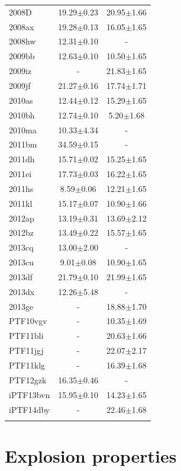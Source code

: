 \documentclass[a4paper,fleqn,usenatbib]{mnras}
\begin{document}
\begin{table}
\begin{minipage}{90mm}
\begin{tabular}{lcc}
2008D & 19.29$\pm$0.23 & 20.95$\pm$1.66 \\
2008ax & 19.28$\pm$0.13 & 16.05$\pm$1.65 \\
2008hw & 12.31$\pm$0.10 & - \\
2009bb & 12.63$\pm$0.10 & 10.50$\pm$1.65 \\
2009iz & - &21.83$\pm$1.65 \\
2009jf & 21.27$\pm$0.16 & 17.74$\pm$1.71 \\
2010as & 12.44$\pm$0.12 & 15.29$\pm$1.65 \\
2010bh & 12.74$\pm$0.10 & 5.20$\pm$1.68 \\
2010ma & 10.33$\pm$4.34 & - \\
2011bm & 34.59$\pm$0.15 & - \\
2011dh & 15.71$\pm$0.02 & 15.25$\pm$1.65 \\
2011ei & 17.73$\pm$0.03 & 16.22$\pm$1.65 \\
2011hs & 8.59$\pm$0.06 & 12.21$\pm$1.65 \\
2011kl & 15.17$\pm$0.07 & 10.90$\pm$1.66 \\
2012ap & 13.19$\pm$0.31 & 13.69$\pm$2.12 \\
2012bz & 13.49$\pm$0.22 & 15.57$\pm$1.65 \\
2013cq & 13.00$\pm$2.00 & - \\
2013cu & 9.01$\pm$0.08 & 10.90$\pm$1.65 \\
2013df & 21.79$\pm$0.10 & 21.99$\pm$1.65 \\
2013dx & 12.26$\pm$5.48 & - \\
2013ge & - &18.88$\pm$1.70 \\
PTF10vgv & - &10.35$\pm$1.69 \\
PTF11bli & - &20.63$\pm$1.66 \\
PTF11jgj & - &22.07$\pm$2.17 \\
PTF11klg & - &16.39$\pm$1.68 \\
PTF12gzk & 16.35$\pm$0.46 & - \\
iPTF13bvn & 15.95$\pm$0.10 & 14.23$\pm$1.65 \\
iPTF14dby & - &22.46$\pm$1.68 \\
\hline
 \label{tpall}
\end{tabular}
\end{minipage}
\end{table}

\section{Explosion properties}
\end{document}
